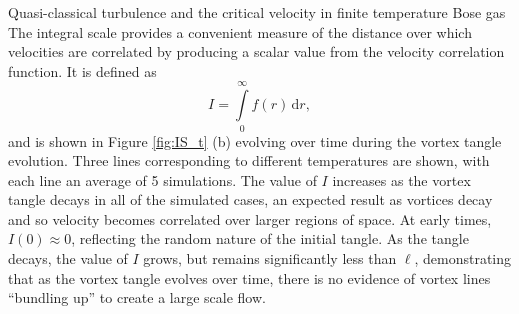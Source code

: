 \begin{chapter}{\label{cha:nonequib}Quasi-classical turbulence and the critical velocity in finite temperature Bose gas}
The integral scale provides a convenient measure of the distance over which velocities are correlated by producing a scalar value from the velocity correlation function. It is defined as
\begin{equation}
I = \int\limits_0^\infty\! f(r)\, \mathrm{d}r,
\end{equation}
and is shown in Figure \ref{fig:IS_t} (b) evolving over time during the vortex tangle evolution. Three lines corresponding to different temperatures are shown, with each line an average of 5 simulations. The value of $I$ increases as the vortex tangle decays in all of the simulated cases, an expected result as vortices decay and so velocity becomes correlated over larger regions of space. At early times, $I(0)\approx0$, reflecting the random nature of the initial tangle. As the tangle decays, the value of $I$ grows, but remains significantly less than $\ell$, demonstrating that as the vortex tangle evolves over time, there is no evidence of vortex lines ``bundling up'' to create a large scale flow.


\end{chapter}
